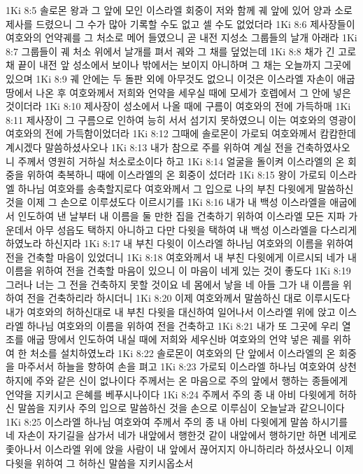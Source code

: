 1Ki 8:5  솔로몬 왕과 그 앞에 모인 이스라엘 회중이 저와 함께 궤 앞에 있어 양과 소로 제사를 드렸으니 그 수가 많아 기록할 수도 없고 셀 수도 없었더라
1Ki 8:6  제사장들이 여호와의 언약궤를 그 처소로 메어 들였으니 곧 내전 지성소 그룹들의 날개 아래라
1Ki 8:7  그룹들이 궤 처소 위에서 날개를 펴서 궤와 그 채를 덮었는데
1Ki 8:8  채가 긴 고로 채 끝이 내전 앞 성소에서 보이나 밖에서는 보이지 아니하며 그 채는 오늘까지 그곳에 있으며
1Ki 8:9  궤 안에는 두 돌판 외에 아무것도 없으니 이것은 이스라엘 자손이 애굽 땅에서 나온 후 여호와께서 저희와 언약을 세우실 때에 모세가 호렙에서 그 안에 넣은 것이더라
1Ki 8:10  제사장이 성소에서 나올 때에 구름이 여호와의 전에 가득하매
1Ki 8:11  제사장이 그 구름으로 인하여 능히 서서 섬기지 못하였으니 이는 여호와의 영광이 여호와의 전에 가득함이었더라
1Ki 8:12  그때에 솔로몬이 가로되 여호와께서 캄캄한데 계시겠다 말씀하셨사오나
1Ki 8:13  내가 참으로 주를 위하여 계실 전을 건축하였사오니 주께서 영원히 거하실 처소로소이다 하고
1Ki 8:14  얼굴을 돌이켜 이스라엘의 온 회중을 위하여 축복하니 때에 이스라엘의 온 회중이 섰더라
1Ki 8:15  왕이 가로되 이스라엘 하나님 여호와를 송축할지로다 여호와께서 그 입으로 나의 부친 다윗에게 말씀하신 것을 이제 그 손으로 이루셨도다 이르시기를
1Ki 8:16  내가 내 백성 이스라엘을 애굽에서 인도하여 낸 날부터 내 이름을 둘 만한 집을 건축하기 위하여 이스라엘 모든 지파 가운데서 아무 성읍도 택하지 아니하고 다만 다윗을 택하여 내 백성 이스라엘을 다스리게 하였노라 하신지라
1Ki 8:17  내 부친 다윗이 이스라엘 하나님 여호와의 이름을 위하여 전을 건축할 마음이 있었더니
1Ki 8:18  여호와께서 내 부친 다윗에게 이르시되 네가 내 이름을 위하여 전을 건축할 마음이 있으니 이 마음이 네게 있는 것이 좋도다
1Ki 8:19  그러나 너는 그 전을 건축하지 못할 것이요 네 몸에서 낳을 네 아들 그가 내 이름을 위하여 전을 건축하리라 하시더니
1Ki 8:20  이제 여호와께서 말씀하신 대로 이루시도다 내가 여호와의 허하신대로 내 부친 다윗을 대신하여 일어나서 이스라엘 위에 앉고 이스라엘 하나님 여호와의 이름을 위하여 전을 건축하고
1Ki 8:21  내가 또 그곳에 우리 열조를 애굽 땅에서 인도하여 내실 때에 저희와 세우신바 여호와의 언약 넣은 궤를 위하여 한 처소를 설치하였노라
1Ki 8:22  솔로몬이 여호와의 단 앞에서 이스라엘의 온 회중을 마주서서 하늘을 향하여 손을 펴고
1Ki 8:23  가로되 이스라엘 하나님 여호와여 상천 하지에 주와 같은 신이 없나이다 주께서는 온 마음으로 주의 앞에서 행하는 종들에게 언약을 지키시고 은혜를 베푸시나이다
1Ki 8:24  주께서 주의 종 내 아비 다윗에게 허하신 말씀을 지키사 주의 입으로 말씀하신 것을 손으로 이루심이 오늘날과 같으니이다
1Ki 8:25  이스라엘 하나님 여호와여 주께서 주의 종 내 아비 다윗에게 말씀 하시기를 네 자손이 자기길을 삼가서 네가 내앞에서 행한것 같이 내앞에서 행하기만 하면 네게로 좇아나서 이스라엘 위에 앉을 사람이 내 앞에서 끊어지지 아니하리라 하셨사오니 이제 다윗을 위하여 그 허하신 말씀을 지키시옵소서
